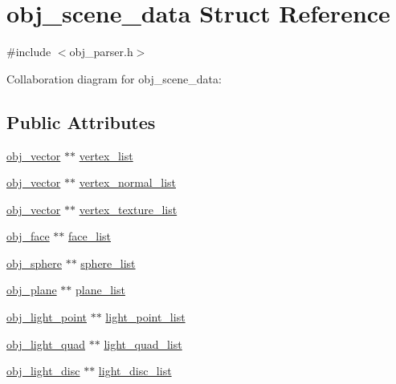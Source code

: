 \hypertarget{structobj__scene__data}{\section{obj\+\_\+scene\+\_\+data Struct Reference}
\label{structobj__scene__data}
}


{\ttfamily \#include $<$obj\+\_\+parser.\+h$>$}



Collaboration diagram for obj\+\_\+scene\+\_\+data\+:
\subsection*{Public Attributes}
\begin{DoxyCompactItemize}
\item 
\hyperlink{structobj__vector}{obj\+\_\+vector} $\ast$$\ast$ \hyperlink{structobj__scene__data_ae63c9e7899791d0ac616aab05d2a3d55}{vertex\+\_\+list}
\item 
\hyperlink{structobj__vector}{obj\+\_\+vector} $\ast$$\ast$ \hyperlink{structobj__scene__data_a8407af16c78de18ecb879dc627109560}{vertex\+\_\+normal\+\_\+list}
\item 
\hyperlink{structobj__vector}{obj\+\_\+vector} $\ast$$\ast$ \hyperlink{structobj__scene__data_a31170ee75ff892af0c72eace0c6da368}{vertex\+\_\+texture\+\_\+list}
\item 
\hyperlink{structobj__face}{obj\+\_\+face} $\ast$$\ast$ \hyperlink{structobj__scene__data_a64650d8d984a1c2aadab3625a29981cb}{face\+\_\+list}
\item 
\hyperlink{structobj__sphere}{obj\+\_\+sphere} $\ast$$\ast$ \hyperlink{structobj__scene__data_a48c0c2242f103292e3319d0f0ba25b6c}{sphere\+\_\+list}
\item 
\hyperlink{structobj__plane}{obj\+\_\+plane} $\ast$$\ast$ \hyperlink{structobj__scene__data_aa4963650fca6d3ffc3c8ed6c8abdd27c}{plane\+\_\+list}
\item 
\hyperlink{structobj__light__point}{obj\+\_\+light\+\_\+point} $\ast$$\ast$ \hyperlink{structobj__scene__data_ac9d4ade26879f621c8be95ef60288fc5}{light\+\_\+point\+\_\+list}
\item 
\hyperlink{structobj__light__quad}{obj\+\_\+light\+\_\+quad} $\ast$$\ast$ \hyperlink{structobj__scene__data_afc077a32a86fa4c912b2175b8ae811e4}{light\+\_\+quad\+\_\+list}
\item 
\hyperlink{structobj__light__disc}{obj\+\_\+light\+\_\+disc} $\ast$$\ast$ \hyperlink{structobj__scene__data_aa18fb1fe6d14e4c793dc01b89ac78dd8}{light\+\_\+disc\+\_\+list}
$$
\end{DoxyCompactItemize}
